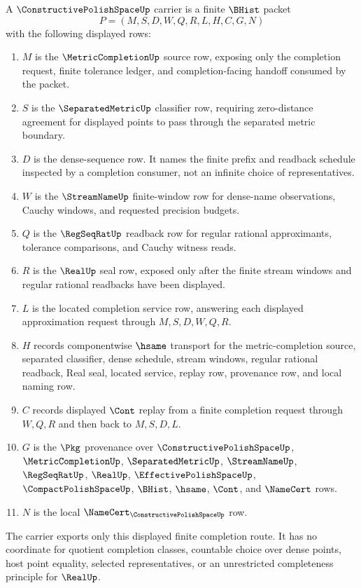 \begin{definition}\label{def:constructive-polish-space-carrier}
A $\ConstructivePolishSpaceUp$ carrier is a finite $\BHist$ packet
$$
P=(M,S,D,W,Q,R,L,H,C,G,N)
$$
with the following displayed rows:
\begin{enumerate}
\item $M$ is the $\MetricCompletionUp$ source row, exposing only the completion request, finite tolerance ledger, and completion-facing handoff consumed by the packet.
\item $S$ is the $\SeparatedMetricUp$ classifier row, requiring zero-distance agreement for displayed points to pass through the separated metric boundary.
\item $D$ is the dense-sequence row. It names the finite prefix and readback schedule inspected by a completion consumer, not an infinite choice of representatives.
\item $W$ is the $\StreamNameUp$ finite-window row for dense-name observations, Cauchy windows, and requested precision budgets.
\item $Q$ is the $\RegSeqRatUp$ readback row for regular rational approximants, tolerance comparisons, and Cauchy witness reads.
\item $R$ is the $\RealUp$ seal row, exposed only after the finite stream windows and regular rational readbacks have been displayed.
\item $L$ is the located completion service row, answering each displayed approximation request through $M,S,D,W,Q,R$.
\item $H$ records componentwise $\hsame$ transport for the metric-completion source, separated classifier, dense schedule, stream windows, regular rational readback, Real seal, located service, replay row, provenance row, and local naming row.
\item $C$ records displayed $\Cont$ replay from a finite completion request through $W,Q,R$ and then back to $M,S,D,L$.
\item $G$ is the $\Pkg$ provenance over $\ConstructivePolishSpaceUp$, $\MetricCompletionUp$, $\SeparatedMetricUp$, $\StreamNameUp$, $\RegSeqRatUp$, $\RealUp$, $\EffectivePolishSpaceUp$, $\CompactPolishSpaceUp$, $\BHist$, $\hsame$, $\Cont$, and $\NameCert$ rows.
\item $N$ is the local $\NameCert_{\ConstructivePolishSpaceUp}$ row.
\end{enumerate}
The carrier exports only this displayed finite completion route. It has no coordinate for quotient completion classes, countable choice over dense points, host point equality, selected representatives, or an unrestricted completeness principle for $\RealUp$.
\end{definition}

